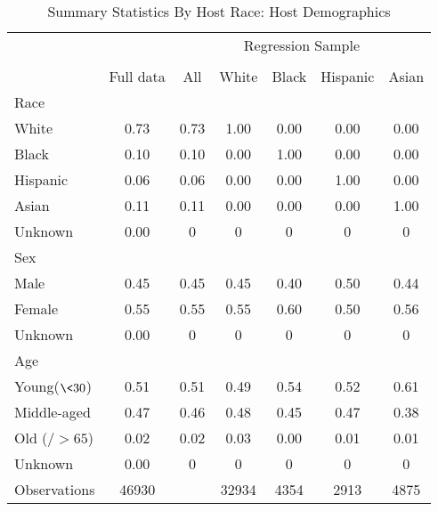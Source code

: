 \begin{table}[htbp]
\caption{Summary Statistics By Host Race: Host Demographics}
\begin{center}%
\small\begin{tabular}{l c | c | c c c c}
& \multicolumn{1}{c}{} & \multicolumn{5}{c}{Regression Sample}
\\
 \cmidrule(r){3-7}
\\
 & \multicolumn{1}{c}{Full data} & \multicolumn{1}{c}{All} & White & Black & Hispanic & Asian
\\
\hline\hline\noalign{\smallskip} 
 Race &&&&&& \\
 \hspace{10bp}White & 0.73 & 0.73 &  1.00 & 0.00 &  0.00 & 0.00 \\  \hspace{10bp}Black & 0.10 & 0.10 &  0.00 & 1.00 &  0.00 & 0.00 \\  \hspace{10bp}Hispanic & 0.06 & 0.06 &  0.00 & 0.00 &  1.00 & 0.00 \\  \hspace{10bp}Asian & 0.11 & 0.11 &  0.00 & 0.00 &  0.00 & 1.00 \\  \hspace{10bp}Unknown & 0.00 & {0} & {0} &  {0}  & {0}  & {0} \\  Sex &&&&&& \\
 \hspace{10bp}Male & 0.45 & 0.45 &  0.45 & 0.40 &  0.50 & 0.44 \\  \hspace{10bp}Female & 0.55 & 0.55 &  0.55 & 0.60 &  0.50 & 0.56 \\  \hspace{10bp}Unknown & 0.00 & {0} & {0} &  {0}  & {0}  & {0} \\  Age &&&&&& \\
 \hspace{10bp}Young($\<30$) & 0.51 & 0.51 &  0.49 & 0.54 &  0.52 & 0.61 \\  \hspace{10bp}Middle-aged & 0.47 & 0.46 &  0.48 & 0.45 &  0.47 & 0.38 \\  \hspace{10bp}Old ($/>65$) &              0.02 & 0.02 &  0.03 & 0.00 &  0.01 & 0.01 \\  \hspace{10bp}Unknown & 0.00 & {0} & {0} &  {0}  & {0}  & {0} \\ \hline
Observations & 46930 &  & 32934 & 4354 & 2913 & 4875 

\end{tabular}
\end{center}
\end{table}
